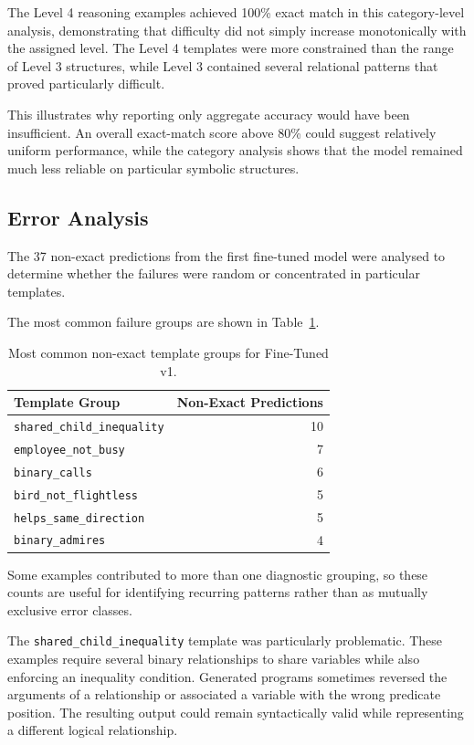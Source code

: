 \documentclass[11pt]{article} %
\theoremstyle{plain}
\theoremstyle{definition}
\begin{document}
The Level 4 reasoning examples achieved 100\% exact match in this
category-level analysis, demonstrating that difficulty did not simply increase
monotonically with the assigned level. The Level 4 templates were more
constrained than the range of Level 3 structures, while Level 3 contained
several relational patterns that proved particularly difficult.

This illustrates why reporting only aggregate accuracy would have been
insufficient. An overall exact-match score above 80\% could suggest relatively
uniform performance, while the category analysis shows that the model remained
much less reliable on particular symbolic structures.


\subsection{Error Analysis}

The 37 non-exact predictions from the first fine-tuned model were analysed to
determine whether the failures were random or concentrated in particular
templates.

The most common failure groups are shown in
Table~\ref{tab:v1-errors}.

\begin{table}[ht]
\centering
\caption{Most common non-exact template groups for Fine-Tuned v1.}
\label{tab:v1-errors}
\begin{tabular}{lr}
\toprule
\textbf{Template Group} & \textbf{Non-Exact Predictions} \\
\midrule
\texttt{shared\_child\_inequality} & 10 \\
\texttt{employee\_not\_busy}       & 7  \\
\texttt{binary\_calls}             & 6  \\
\texttt{bird\_not\_flightless}     & 5  \\
\texttt{helps\_same\_direction}    & 5  \\
\texttt{binary\_admires}           & 4  \\
\bottomrule
\end{tabular}
\end{table}

Some examples contributed to more than one diagnostic grouping, so these
counts are useful for identifying recurring patterns rather than as mutually
exclusive error classes.

The \texttt{shared\_child\_inequality} template was particularly problematic.
These examples require several binary relationships to share variables while
also enforcing an inequality condition. Generated programs sometimes reversed
the arguments of a relationship or associated a variable with the wrong
predicate position. The resulting output could remain syntactically valid while
representing a different logical relationship.
\end{document}
